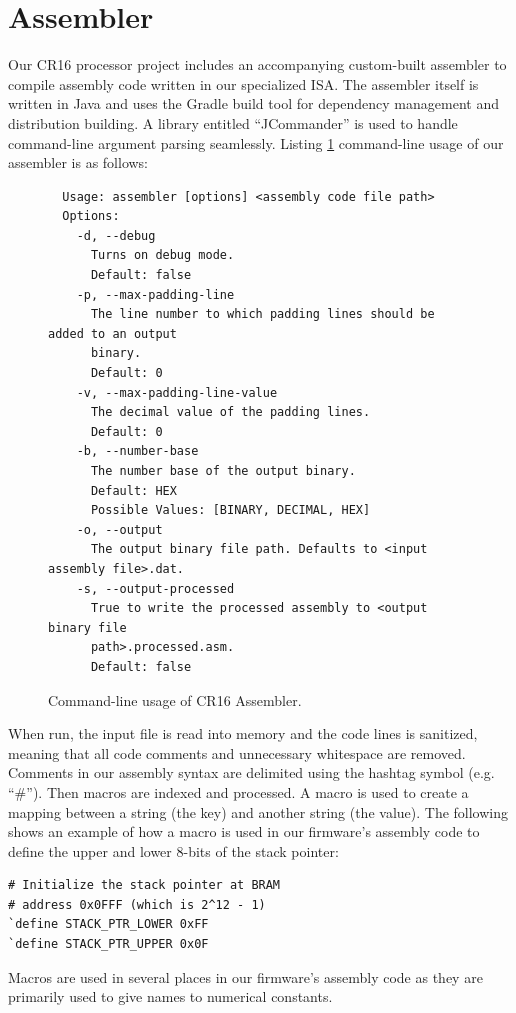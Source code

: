 \documentclass[conference]{IEEEtran}
\begin{document}
\section{Assembler}
Our CR16 processor project includes an accompanying custom-built assembler to compile assembly code written in our specialized ISA. The assembler itself is written in Java and uses the Gradle build tool for dependency management and distribution building. A library entitled ``JCommander'' is used to handle command-line argument parsing seamlessly. Listing \ref{listing:assembler_command_line} command-line usage of our assembler is as follows:
\begin{figure}
  \begin{lstlisting}
  Usage: assembler [options] <assembly code file path>
  Options:
    -d, --debug
      Turns on debug mode.
      Default: false
    -p, --max-padding-line
      The line number to which padding lines should be added to an output
      binary.
      Default: 0
    -v, --max-padding-line-value
      The decimal value of the padding lines.
      Default: 0
    -b, --number-base
      The number base of the output binary.
      Default: HEX
      Possible Values: [BINARY, DECIMAL, HEX]
    -o, --output
      The output binary file path. Defaults to <input assembly file>.dat.
    -s, --output-processed
      True to write the processed assembly to <output binary file
      path>.processed.asm.
      Default: false
  \end{lstlisting}
  \caption{Command-line usage of CR16 Assembler.}
  \label{listing:assembler_command_line}
\end{figure}

When run, the input file is read into memory and the code lines is sanitized, meaning that all code comments and unnecessary whitespace are removed. Comments in our assembly syntax are delimited using the hashtag symbol (e.g. ``\#''). Then macros are indexed and processed. A macro is used to create a mapping between a string (the key) and another string (the value). The following shows an example of how a macro is used in our firmware's assembly code to define the upper and lower 8-bits of the stack pointer:
\begin{verbatim}
# Initialize the stack pointer at BRAM
# address 0x0FFF (which is 2^12 - 1)
`define STACK_PTR_LOWER 0xFF
`define STACK_PTR_UPPER 0x0F
\end{verbatim}
Macros are used in several places in our firmware's assembly code as they are primarily used to give names to numerical constants.
\end{document}
